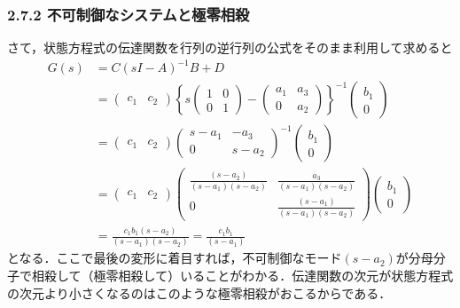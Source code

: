 \begin{frame}[t]
\frametitle{2.7.2 不可制御なシステムと極零相殺}
さて，状態方程式の伝達関数を行列の逆行列の公式をそのまま利用して求めると
\begin{align}
	G(s) & = C(sI-A)^{-1}B + D
\nonumber \\
	&= 
		\left(\begin{array}{cc}
			c_1 & c_2 
		\end{array}\right)
		\left\{ 
			s
			\left(\begin{array}{cc}
				1 & 0 \\
				0 & 1 
			\end{array}\right)
			-
			\left(\begin{array}{cc}
				a_1 & a_3 \\
				0 & a_2
			\end{array}\right)
		\right\} ^{-1}
		\left(\begin{array}{c}
			b_1 \\
			0
		\end{array}\right)
\nonumber \\
	&= 
		\left(\begin{array}{cc}
			c_1 & c_2 
		\end{array}\right)
		\left(\begin{array}{cc}
			s - a_1 & - a_3 \\
			0       & s - a_2
		\end{array}\right) ^{-1}
		\left(\begin{array}{c}
			b_1 \\
			0
		\end{array}\right)
\nonumber \\
	&= 
		\left(\begin{array}{cc}
			c_1 & c_2 
		\end{array}\right)
		\left(\begin{array}{cc}
			\frac{(s-a_2)}{(s-a_1)(s-a_2)} & \frac{a_3}{(s-a_1)(s-a_2)} \\
			0       & \frac{(s-a_1)}{(s-a_1)(s-a_2)}
		\end{array}\right) 
		\left(\begin{array}{c}
			b_1 \\
			0
		\end{array}\right)
\nonumber \\
	&= 
		\frac{c_1 b_1(s-a_2)}{(s-a_1)(s-a_2)}
	= 
		\frac{c_1 b_1}{(s-a_1)}
\end{align}
となる．ここで最後の変形に着目すれば，不可制御なモード$(s-a_2)$が分母分子で相殺して（極零相殺して）いることがわかる．伝達関数の次元が状態方程式の次元より小さくなるのはこのような極零相殺がおこるからである．

\end{frame}


